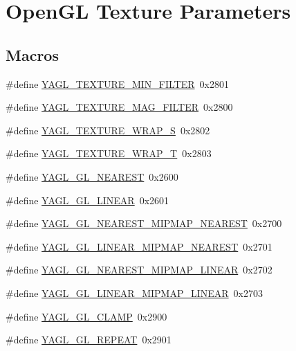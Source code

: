 \hypertarget{group____consts__ogltex}{\section{Open\-G\-L Texture Parameters}
\label{group____consts__ogltex}
}
\subsection*{Macros}
\begin{DoxyCompactItemize}
\item 
\#define \hyperlink{group____consts__ogltex_ga6ccd39198659adc1967a53737c30ec32}{Y\-A\-G\-L\-\_\-\-T\-E\-X\-T\-U\-R\-E\-\_\-\-M\-I\-N\-\_\-\-F\-I\-L\-T\-E\-R}~0x2801
\item 
\#define \hyperlink{group____consts__ogltex_gaafb5ab1732b894052b91b283713b1a59}{Y\-A\-G\-L\-\_\-\-T\-E\-X\-T\-U\-R\-E\-\_\-\-M\-A\-G\-\_\-\-F\-I\-L\-T\-E\-R}~0x2800
\item 
\#define \hyperlink{group____consts__ogltex_gaaa94e7e26e2ca988be739e3ede83d3bc}{Y\-A\-G\-L\-\_\-\-T\-E\-X\-T\-U\-R\-E\-\_\-\-W\-R\-A\-P\-\_\-\-S}~0x2802
\item 
\#define \hyperlink{group____consts__ogltex_gaf3c7f2995400a571ddcff69212eee82d}{Y\-A\-G\-L\-\_\-\-T\-E\-X\-T\-U\-R\-E\-\_\-\-W\-R\-A\-P\-\_\-\-T}~0x2803
\item 
\#define \hyperlink{group____consts__ogltex_gafd01368582e3ee7306cb3e9eabb5e036}{Y\-A\-G\-L\-\_\-\-G\-L\-\_\-\-N\-E\-A\-R\-E\-S\-T}~0x2600
\item 
\#define \hyperlink{group____consts__ogltex_ga57247a1c92fe4c7804fd9b1f886e70f8}{Y\-A\-G\-L\-\_\-\-G\-L\-\_\-\-L\-I\-N\-E\-A\-R}~0x2601
\item 
\#define \hyperlink{group____consts__ogltex_ga94476994ab45f61041cce674a56960ec}{Y\-A\-G\-L\-\_\-\-G\-L\-\_\-\-N\-E\-A\-R\-E\-S\-T\-\_\-\-M\-I\-P\-M\-A\-P\-\_\-\-N\-E\-A\-R\-E\-S\-T}~0x2700
\item 
\#define \hyperlink{group____consts__ogltex_gaebce0226ad26968947ed9b69005ec87e}{Y\-A\-G\-L\-\_\-\-G\-L\-\_\-\-L\-I\-N\-E\-A\-R\-\_\-\-M\-I\-P\-M\-A\-P\-\_\-\-N\-E\-A\-R\-E\-S\-T}~0x2701
\item 
\#define \hyperlink{group____consts__ogltex_ga8b86f112cd8d71d1945108d8743adb70}{Y\-A\-G\-L\-\_\-\-G\-L\-\_\-\-N\-E\-A\-R\-E\-S\-T\-\_\-\-M\-I\-P\-M\-A\-P\-\_\-\-L\-I\-N\-E\-A\-R}~0x2702
\item 
\#define \hyperlink{group____consts__ogltex_ga2f3ad942dfb78bf9ff838100909e2e52}{Y\-A\-G\-L\-\_\-\-G\-L\-\_\-\-L\-I\-N\-E\-A\-R\-\_\-\-M\-I\-P\-M\-A\-P\-\_\-\-L\-I\-N\-E\-A\-R}~0x2703
\item 
\#define \hyperlink{group____consts__ogltex_ga30ae4451693aba71138957a92126ff1a}{Y\-A\-G\-L\-\_\-\-G\-L\-\_\-\-C\-L\-A\-M\-P}~0x2900
\item 
\#define \hyperlink{group____consts__ogltex_ga1a09981097d954dc11925607f0ba3d70}{Y\-A\-G\-L\-\_\-\-G\-L\-\_\-\-R\-E\-P\-E\-A\-T}~0x2901
\end{DoxyCompactItemize}


